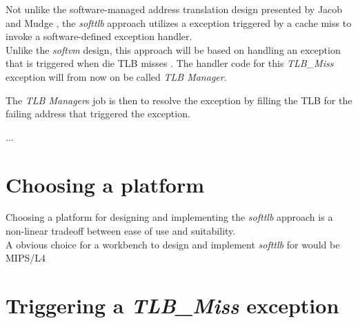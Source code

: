 Not unlike the software-managed address translation design presented by Jacob and Mudge \cite{jacobSoftwaremanagedAddressTranslation1997},
the \textit{softtlb} approach utilizes a exception triggered by a cache miss to invoke a software-defined
exception handler.\\
Unlike the \textit{softvm} design, this approach will be based on handling an exception that is triggered
when die TLB misses .
The handler code for this \textit{TLB\_Miss} exception will from now on be called \textit{TLB Manager}.

The \textit{TLB Manager}s job is then to resolve the exception by filling the TLB for the failing address
that triggered the exception.

...

\section{Choosing a platform}
Choosing a platform for designing and implementing the \textit{softtlb} approach is a non-linear tradeoff between
ease of use and suitability.\\
A obvious choice for a workbench to design and implement \textit{softtlb} for would be MIPS/L4 \cite{heiserAnatomyHighPerformanceMicrokernel}


\section{Triggering a \textit{TLB\_Miss} exception}


